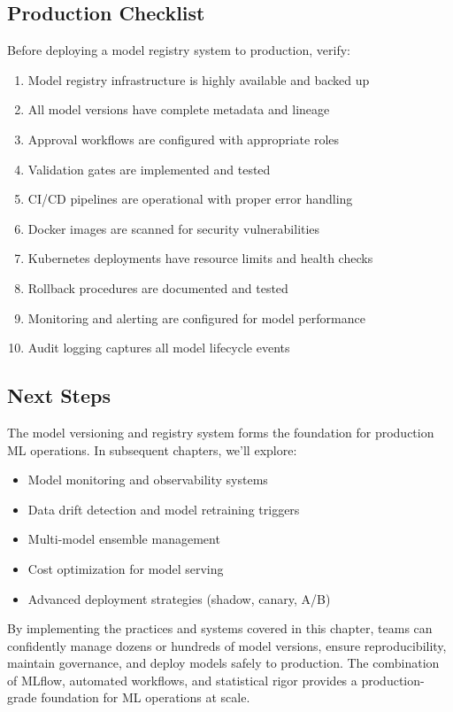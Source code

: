 \subsection{Production Checklist}

Before deploying a model registry system to production, verify:

\begin{enumerate}
    \item Model registry infrastructure is highly available and backed up
    \item All model versions have complete metadata and lineage
    \item Approval workflows are configured with appropriate roles
    \item Validation gates are implemented and tested
    \item CI/CD pipelines are operational with proper error handling
    \item Docker images are scanned for security vulnerabilities
    \item Kubernetes deployments have resource limits and health checks
    \item Rollback procedures are documented and tested
    \item Monitoring and alerting are configured for model performance
    \item Audit logging captures all model lifecycle events
\end{enumerate}

\subsection{Next Steps}

The model versioning and registry system forms the foundation for production ML operations. In subsequent chapters, we'll explore:

\begin{itemize}
    \item Model monitoring and observability systems
    \item Data drift detection and model retraining triggers
    \item Multi-model ensemble management
    \item Cost optimization for model serving
    \item Advanced deployment strategies (shadow, canary, A/B)
\end{itemize}

By implementing the practices and systems covered in this chapter, teams can confidently manage dozens or hundreds of model versions, ensure reproducibility, maintain governance, and deploy models safely to production. The combination of MLflow, automated workflows, and statistical rigor provides a production-grade foundation for ML operations at scale.
